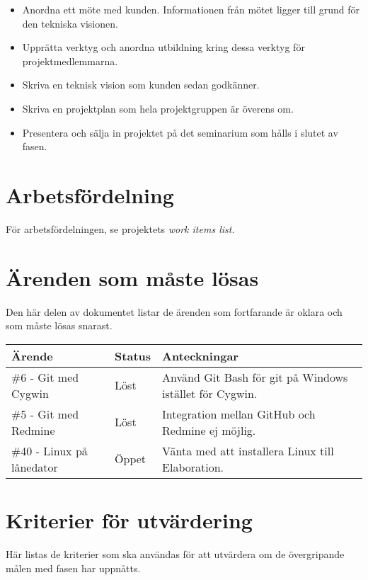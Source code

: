 \begin{itemize}
	\item Anordna ett möte med kunden. Informationen från mötet ligger till grund för den tekniska visionen.
	\item Upprätta verktyg och anordna utbildning kring dessa verktyg för projektmedlemmarna.
	\item Skriva en teknisk vision som kunden sedan godkänner.
	\item Skriva en projektplan som hela projektgruppen är överens om.
	\item Presentera och sälja in projektet på det seminarium som hålls i slutet av fasen.
\end{itemize}

\section{Arbetsfördelning}
För arbetsfördelningen, se projektets \textit{work items list}.

\section{Ärenden som måste lösas}
Den här delen av dokumentet listar de ärenden som fortfarande är oklara och som måste lösas snarast.

\begin{center}
	\begin{tabular}{| l | l | l |}
		\hline Ärende & Status & Anteckningar \\
		\hline \#6 - Git med Cygwin & Löst & Använd Git Bash för git på Windows istället för Cygwin. \\
		\hline \#5 - Git med Redmine & Löst & Integration mellan GitHub och Redmine ej möjlig. \\
		\hline \#40 - Linux på lånedator & Öppet & Vänta med att installera Linux till Elaboration. \\
		\hline
	\end{tabular}
\end{center}

\section{Kriterier för utvärdering}
Här listas de kriterier som ska användas för att utvärdera om de övergripande målen med fasen har uppnåtts.


